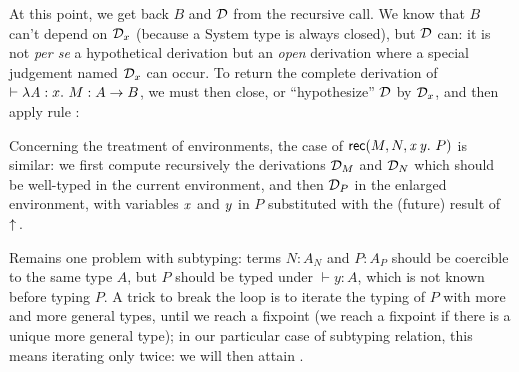 \documentclass{llncs}
\begin{document}
At this point, we get back $B$ and $\mathcal D$ from the recursive call. We
know that $B$ can't depend on $\mathcal D_x$ (because a System
 type is always closed), but $\mathcal D$ can: it is not
\emph{per se} a hypothetical derivation but an \emph{open} derivation
where a special judgement named $\mathcal D_x$ can occur. To return the
complete derivation of $\vdash\lambda{\ensuremath{\text{\textit{A}}}}:{x}.\  M : A \to B$, we must then
close, or ``hypothesize'' $\mathcal D$ by $\mathcal D_x$, and then apply rule
:

\begin{mathleft}
  \quad\quad
  {}
\end{mathleft}

Concerning the treatment of environments, the case of $\text{\textsf{rec}}({M},{N},{\text{\textit{x}}}\,{\text{\textit{y}}}.\ {P})$ is similar: we first compute recursively the derivations $\mathcal D_M$
and $\mathcal D_N$ which should be well-typed in the current environment, and
then $\mathcal D_P$ in the enlarged environment, with variables $\text{\textit{x}}$ and
$\text{\textit{y}}$ in $P$ substituted with the (future) result of $\uparrow\!{}$.

Remains one problem with subtyping: terms $N : A_N$ and $P : A_P$
should be coercible to the same type $A$, but $P$ should be typed
under $\vdash y:A$, which is not known before typing $P$. A trick to
break the loop is to iterate the typing of $P$ with more and more
general types, until we reach a fixpoint (we reach a fixpoint if there
is a unique more general type); in our particular case of subtyping
relation, this means iterating only twice: we will then attain
.
\end{document}
